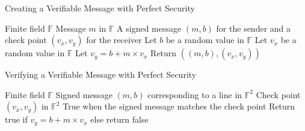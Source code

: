\documentclass[12pt]{dalcsthesis}
\begin{document}
\begin{algorithm}
  \caption{Creating a Verifiable Message with Perfect Security}
  \label{alg:CreatingVerifiableMessageForUnbounded}
  \begin{algorithmic}
    \INPUT Finite field $\mathbb{F}$
    \INPUT Message $m$ in $\mathbb{F}$
    \OUTPUT A signed message $(m, b)$ for the sender and a check point $(v_x, v_y)$ for the receiver
    \STATE Let $b$ be a random value in $\mathbb{F}$ 
    \STATE Let $v_x$ be a random value in $\mathbb{F}$
    \STATE Let $v_y = b + m \times v_x$
    \STATE Return $((m, b), (v_x, v_y))$
  \end{algorithmic}
\end{algorithm}
\begin{algorithm}
  \caption{Verifying a Verifiable Message with Perfect Security}
  \label{alg:VerifyMessageForUnbounded}
  \begin{algorithmic}
    \INPUT Finite field $\mathbb{F}$
    \INPUT Signed message $(m, b)$ corresponding to a line in $\mathbb{F}^2$
    \INPUT Check point $(v_x, v_y)$ in $\mathbb{F}^2$
    \OUTPUT True when the signed message matches the check point
    \STATE Return true if $v_y = b + m \times v_x$ else return false
  \end{algorithmic}
\end{algorithm}
\end{document}
